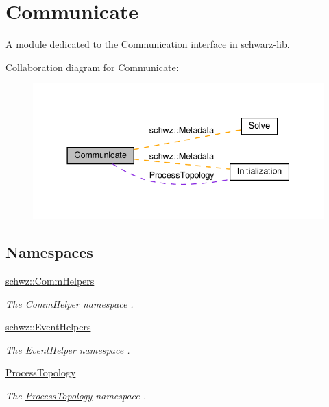 \hypertarget{group__comm}{}\section{Communicate}
\label{group__comm}


A module dedicated to the Communication interface in schwarz-\/lib.  


Collaboration diagram for Communicate\+:
\nopagebreak
\begin{figure}[H]
\begin{center}
\leavevmode
\includegraphics[width=337pt]{group__comm}
\end{center}
\end{figure}
\subsection*{Namespaces}
\begin{DoxyCompactItemize}
\item 
 \hyperlink{namespaceschwz_1_1CommHelpers}{schwz\+::\+Comm\+Helpers}
\begin{DoxyCompactList}\small\item\em The Comm\+Helper namespace . \end{DoxyCompactList}\item 
 \hyperlink{namespaceschwz_1_1EventHelpers}{schwz\+::\+Event\+Helpers}
\begin{DoxyCompactList}\small\item\em The Event\+Helper namespace . \end{DoxyCompactList}\item 
 \hyperlink{namespaceProcessTopology}{Process\+Topology}
\begin{DoxyCompactList}\small\item\em The \hyperlink{namespaceProcessTopology}{Process\+Topology} namespace . \end{DoxyCompactList}\end{DoxyCompactItemize}
